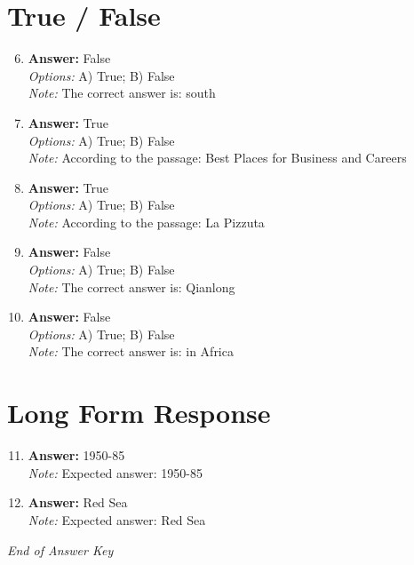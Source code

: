 \documentclass[12pt]{article}
\begin{document}
\section*{True / False}
\begin{enumerate}[label=\arabic*.]
\setcounter{enumi}{5}
\item \textbf{Answer:} False
\\ \textit{Options:} A) True; B) False
\\ \textit{Note:} The correct answer is: south
\item \textbf{Answer:} True
\\ \textit{Options:} A) True; B) False
\\ \textit{Note:} According to the passage: Best Places for Business and Careers
\item \textbf{Answer:} True
\\ \textit{Options:} A) True; B) False
\\ \textit{Note:} According to the passage: La Pizzuta
\item \textbf{Answer:} False
\\ \textit{Options:} A) True; B) False
\\ \textit{Note:} The correct answer is: Qianlong
\item \textbf{Answer:} False
\\ \textit{Options:} A) True; B) False
\\ \textit{Note:} The correct answer is: in Africa
\end{enumerate}

\section*{Long Form Response}
\begin{enumerate}[label=\arabic*.]
\setcounter{enumi}{10}
\item \textbf{Answer:} 1950-85
\\ \textit{Note:} Expected answer: 1950-85
\item \textbf{Answer:} Red Sea
\\ \textit{Note:} Expected answer: Red Sea
\end{enumerate}

\vfill
\noindent\textit{End of Answer Key}
\end{document}
